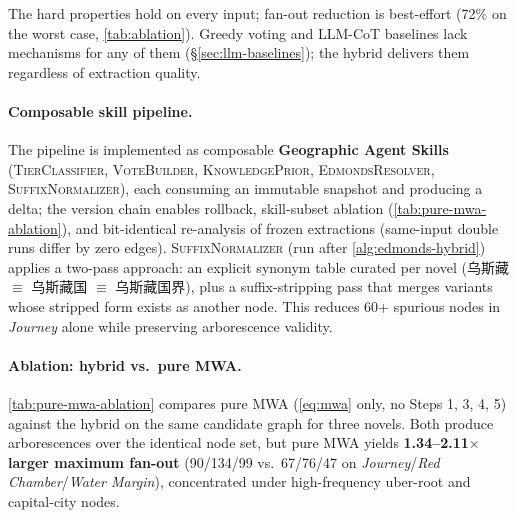 \documentclass[11pt]{article}
\newenvironment{CJK}[2]{}{}
\begin{document}
The hard properties hold on every input; fan-out reduction is best-effort (72\% on the worst case, \autoref{tab:ablation}). Greedy voting and LLM-CoT baselines lack mechanisms for any of them (§\ref{sec:llm-baselines}); the hybrid delivers them regardless of extraction quality.

\paragraph{Composable skill pipeline.}
The pipeline is implemented as composable \textbf{Geographic Agent Skills}
(\textsc{TierClassifier}, \textsc{VoteBuilder}, \textsc{KnowledgePrior},
\textsc{EdmondsResolver}, \textsc{SuffixNormalizer}), each consuming an
immutable snapshot and producing a delta; the version chain enables
rollback, skill-subset ablation (\autoref{tab:pure-mwa-ablation}), and
bit-identical re-analysis of frozen extractions (same-input double runs
differ by zero edges).
\textsc{SuffixNormalizer} (run after \autoref{alg:edmonds-hybrid}) applies
a two-pass approach: an explicit synonym table curated per novel
(\begin{CJK}{UTF8}{gbsn}乌斯藏\end{CJK} $\equiv$
\begin{CJK}{UTF8}{gbsn}乌斯藏国\end{CJK} $\equiv$
\begin{CJK}{UTF8}{gbsn}乌斯藏国界\end{CJK}), plus a suffix-stripping pass
that merges variants whose stripped form exists as another node. This
reduces 60+ spurious nodes in \textit{Journey} alone while preserving
arborescence validity.

\paragraph{Ablation: hybrid vs.\ pure MWA.}
\autoref{tab:pure-mwa-ablation} compares pure MWA (\autoref{eq:mwa} only,
no Steps 1, 3, 4, 5) against the hybrid on the same candidate graph for
three novels. Both produce arborescences over the identical node set, but pure MWA yields
\textbf{1.34--2.11$\times$ larger maximum fan-out} (90/134/99 vs.\ 67/76/47
on \textit{Journey}/\textit{Red Chamber}/\textit{Water Margin}), concentrated
under high-frequency uber-root and capital-city nodes.
\end{document}
